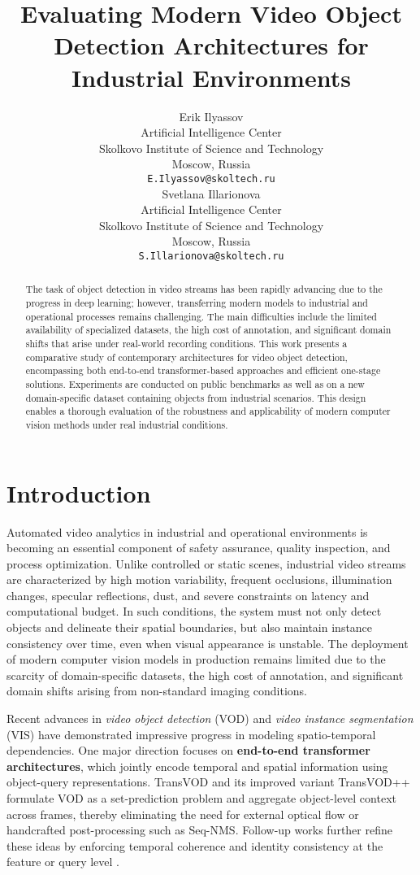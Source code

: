 \documentclass{article}
\title{Evaluating Modern Video Object Detection Architectures for Industrial Environments}
\author{ Erik Ilyassov \\
	Artificial Intelligence Center \\
	Skolkovo Institute of Science and Technology\\
	Moscow, Russia \\
	\texttt{E.Ilyassov@skoltech.ru} \\
	\And
	Svetlana Illarionova \\
	Artificial Intelligence Center \\
	Skolkovo Institute of Science and Technology\\
	Moscow, Russia \\
	\texttt{S.Illarionova@skoltech.ru} \\
}
\date{}
\begin{document}
\maketitle

\begin{abstract}
	The task of object detection in video streams has been rapidly advancing due to the progress in deep learning; however, transferring modern models to industrial and operational processes remains challenging. The main difficulties include the limited availability of specialized datasets, the high cost of annotation, and significant domain shifts that arise under real-world recording conditions. This work presents a comparative study of contemporary architectures for video object detection, encompassing both end-to-end transformer-based approaches and efficient one-stage solutions. Experiments are conducted on public benchmarks as well as on a new domain-specific dataset containing objects from industrial scenarios. This design enables a thorough evaluation of the robustness and applicability of modern computer vision methods under real industrial conditions.
\end{abstract}



\section{Introduction}

Automated video analytics in industrial and operational environments is becoming an essential component of safety assurance, quality inspection, and process optimization. Unlike controlled or static scenes, industrial video streams are characterized by high motion variability, frequent occlusions, illumination changes, specular reflections, dust, and severe constraints on latency and computational budget. In such conditions, the system must not only detect objects and delineate their spatial boundaries, but also maintain instance consistency over time, even when visual appearance is unstable. The deployment of modern computer vision models in production remains limited due to the scarcity of domain-specific datasets, the high cost of annotation, and significant domain shifts arising from non-standard imaging conditions.

Recent advances in \emph{video object detection} (VOD) and \emph{video instance segmentation} (VIS) have demonstrated impressive progress in modeling spatio-temporal dependencies. One major direction focuses on \textbf{end-to-end transformer architectures}, which jointly encode temporal and spatial information using object-query representations. TransVOD and its improved variant TransVOD++ \citep{TransVOD2022,TransVODpp2023} formulate VOD as a set-prediction problem and aggregate object-level context across frames, thereby eliminating the need for external optical flow or handcrafted post-processing such as Seq-NMS. Follow-up works further refine these ideas by enforcing temporal coherence and identity consistency at the feature or query level \citep{ClipVID2023,ICA2023}. 
\end{document}
